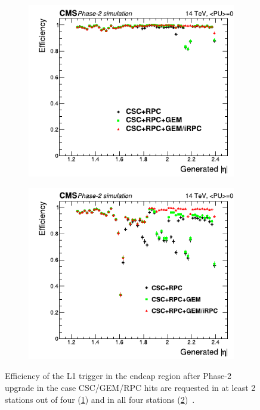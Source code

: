 	\begin{figure}[H]
		\begin{subfigure}{0.5\linewidth}
			\centering
			\includegraphics[width=\linewidth]{fig/chapt3/EMTF-eff-2of4.pdf}
			\caption{\label{fig:EMTF-eff:A}}
		\end{subfigure}
		\begin{subfigure}{0.5\linewidth}
			\centering
			\includegraphics[width=\linewidth]{fig/chapt3/EMTF-eff-4of4.pdf}
			\caption{\label{fig:EMTF-eff:B}}
		\end{subfigure}
		\caption{\label{fig:EMTF-eff} Efficiency of the L1 trigger in the endcap region after Phase-2 upgrade in the case CSC/GEM/RPC hits are requested in at least 2 stations out of four (\ref{fig:EMTF-eff:A}) and in all four stations (\ref{fig:EMTF-eff:B})~\cite{PHASEIITP}.}
	\end{figure}

